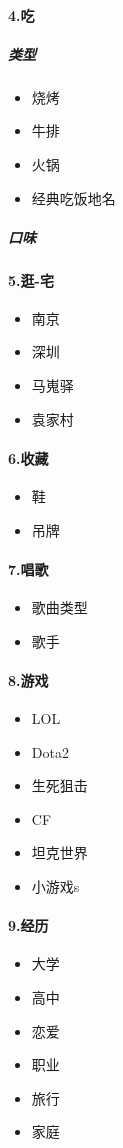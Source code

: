 \documentclass[UTF8,a4paper,8pt]{ctexbook}
\begin{document}
		 \paragraph{4.吃}
			 \subparagraph{类型}
				 \begin{itemize}
				 	\item 烧烤
				 	\item 牛排
				 	\item 火锅
				 	\item 经典吃饭地名
				 \end{itemize}
			 \subparagraph{口味}
		 \paragraph{5.逛-宅}
			 \begin{itemize}
			 	\item 南京
			 	\item 深圳
			 	\item 马嵬驿
			 	\item 袁家村
			 \end{itemize}
		 \paragraph{6.收藏}
			 \begin{itemize}
				 \item 鞋
				 \item 吊牌
			 \end{itemize}
		 \paragraph{7.唱歌}
			 \begin{itemize}
			 	\item 歌曲类型
			 	\item 歌手
			 \end{itemize}
		 \paragraph{8.游戏}
			 \begin{itemize}
			 	\item  LOL
			 	\item  Dota2
			 	\item  生死狙击
			 	\item  CF
			 	\item  坦克世界
			 	\item  小游戏s
			 \end{itemize}
		 \paragraph{9.经历}
			 \begin{itemize}
			 	\item 大学
			 	\item 高中
			 	\item 恋爱
			 	\item 职业
			 	\item 旅行
			 	\item 家庭
			 \end{itemize}
\end{document}
